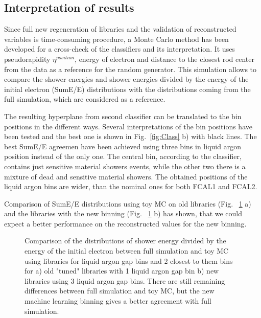 \subsection{Interpretation of results}

Since full new regeneration of libraries and the validation of reconstructed variables is time-consuming procedure, a Monte Carlo method has been developed for a cross-check of the classifiers and its interpretation. It uses pseudorapidity $\eta^{position}$, energy of electron and distance to the closest rod center from the data as a reference for the random generator. This simulation allows to compare the shower energies and shower energies divided by  the energy of the initial electron (SumE/E) distributions with the distributions coming from the full simulation, which are considered as a reference.

The resulting hyperplane from second classifier can be translated to the bin positions in the different ways. Several interpretations of the bin positions have been tested and the best one is shown in Fig.~\ref{fig:Class} b) with black lines. The best SumE/E agreemen have been achieved using three bins in liquid argon position instead of the only one. The central bin, according to the classifier, contains just sensitive material showers events, while the other two there is a mixture of dead and sensitive material showers. The obtained positions of the liquid argon bins are wider, than the nominal ones for both FCAL1 and FCAL2.

Comparison of SumE/E distributions using toy MC on old libraries (Fig. ~\ref{fig:Interpret} a) and the libraries with the new binning (Fig. ~\ref{fig:Interpret} b) has shown, that we could expect a better performance on the reconstructed values for the new binning.

\begin{figure}[!tbp]
\begin{minipage}[h]{0.49\linewidth}
\end{minipage}
\hfill
\begin{minipage}[h]{0.49\linewidth}
\end{minipage}
\caption{Comparison of the distributions of shower energy divided by  the energy of the initial electron between full simulation and toy MC using libraries for liquid argon gap bins and 2 closest to them bins for a) old "tuned" libraries with 1 liquid argon gap bin  b) new libraries using 3 liquid argon gap bins. There are still remaining differences between full simulation and toy MC, but the new machine learning binning gives a better agreement with full simulation.}
\label{fig:Interpret}
\end{figure}


